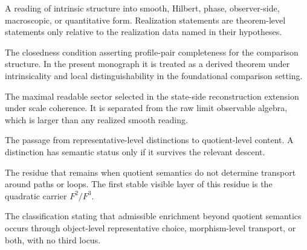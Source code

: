 \begin{description}[leftmargin=3.6cm,style=nextline]
\item[Realization]
A reading of intrinsic structure into smooth, Hilbert, phase,
observer-side, macroscopic, or quantitative form.  Realization statements
are theorem-level statements only relative to the realization data named
in their hypotheses.

\item[Rectangular completeness]
The closedness condition asserting profile-pair completeness for the
comparison structure.  In the present monograph it is treated as a
derived theorem under intrinsicality and local distinguishability in the
foundational comparison setting.

\item[Regular sector]
The maximal readable sector selected in the state-side reconstruction
extension under scale coherence.  It is separated from the raw limit
observable algebra, which is larger than any realized smooth reading.

\item[Semantic descent]
The passage from representative-level distinctions to quotient-level
content.  A distinction has semantic status only if it survives the
relevant descent.

\item[Transport obstruction]
The residue that remains when quotient semantics do not determine
transport around paths or loops.  The first stable visible layer of this
residue is the quadratic carrier \(F^2/F^3\).

\item[Two-locus theorem]
The classification stating that admissible enrichment beyond quotient
semantics occurs through object-level representative choice, morphism-level
transport, or both, with no third locus.
\end{description}

